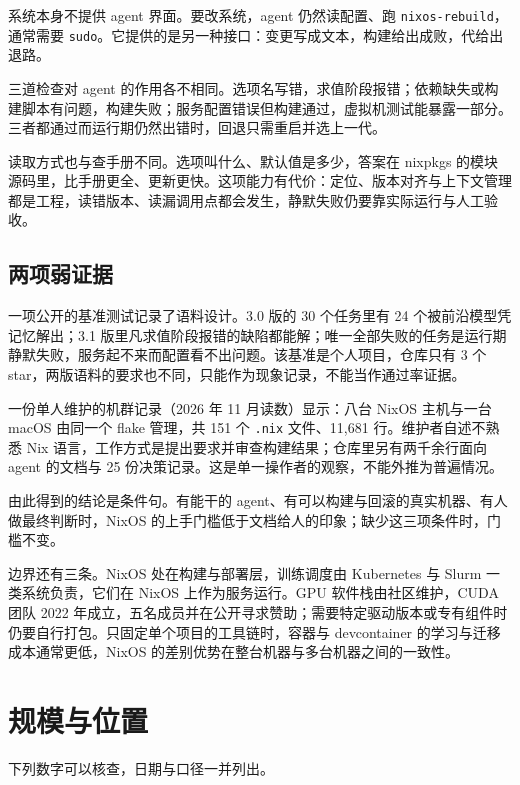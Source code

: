 系统本身不提供 agent 界面。要改系统，agent 仍然读配置、跑 \texttt{nixos-rebuild}，通常需要 \texttt{sudo}。它提供的是另一种接口：变更写成文本，构建给出成败，代给出退路。

三道检查对 agent 的作用各不相同。选项名写错，求值阶段报错；依赖缺失或构建脚本有问题，构建失败；服务配置错误但构建通过，虚拟机测试能暴露一部分。三者都通过而运行期仍然出错时，回退只需重启并选上一代。

读取方式也与查手册不同。选项叫什么、默认值是多少，答案在 nixpkgs 的模块源码里，比手册更全、更新更快。这项能力有代价：定位、版本对齐与上下文管理都是工程，读错版本、读漏调用点都会发生，静默失败仍要靠实际运行与人工验收。

\subsection{两项弱证据}

一项公开的基准测试记录了语料设计。3.0 版的 30 个任务里有 24 个被前沿模型凭记忆解出；3.1 版里凡求值阶段报错的缺陷都能解；唯一全部失败的任务是运行期静默失败，服务起不来而配置看不出问题。该基准是个人项目，仓库只有 3 个 star，两版语料的要求也不同，只能作为现象记录，不能当作通过率证据。

一份单人维护的机群记录（2026 年 11 月读数）显示：八台 NixOS 主机与一台 macOS 由同一个 flake 管理，共 151 个 \texttt{.nix} 文件、11,681 行。维护者自述不熟悉 Nix 语言，工作方式是提出要求并审查构建结果；仓库里另有两千余行面向 agent 的文档与 25 份决策记录。这是单一操作者的观察，不能外推为普遍情况。

由此得到的结论是条件句。有能干的 agent、有可以构建与回滚的真实机器、有人做最终判断时，NixOS 的上手门槛低于文档给人的印象；缺少这三项条件时，门槛不变。

边界还有三条。NixOS 处在构建与部署层，训练调度由 Kubernetes 与 Slurm 一类系统负责，它们在 NixOS 上作为服务运行。GPU 软件栈由社区维护，CUDA 团队 2022 年成立，五名成员并在公开寻求赞助；需要特定驱动版本或专有组件时仍要自行打包。只固定单个项目的工具链时，容器与 devcontainer 的学习与迁移成本通常更低，NixOS 的差别优势在整台机器与多台机器之间的一致性。

\section{规模与位置}

下列数字可以核查，日期与口径一并列出。

